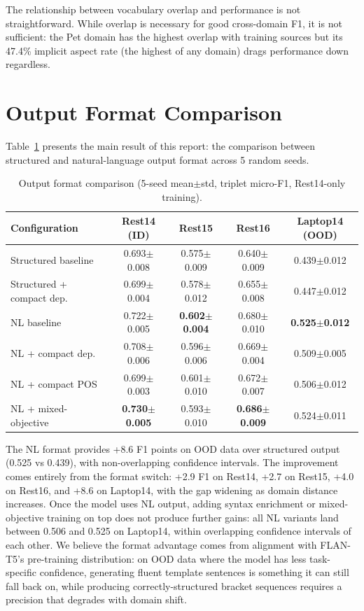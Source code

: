 \documentclass[12pt,a4paper]{report}
\begin{document}
The relationship between vocabulary overlap and performance is not straightforward. While overlap is necessary for good cross-domain F1, it is not sufficient: the Pet domain has the highest overlap with training sources but its 47.4\% implicit aspect rate (the highest of any domain) drags performance down regardless.


\section{Output Format Comparison}\label{sec:format-results}

Table~\ref{tab:format-5seed} presents the main result of this report: the comparison between structured and natural-language output format across 5 random seeds.

\begin{table}[H]
\centering
\caption{Output format comparison (5-seed mean$\pm$std, triplet micro-F1, Rest14-only training).}
\label{tab:format-5seed}
\small
\begin{tabular}{@{}lcccc@{}}
\toprule
\textbf{Configuration} & \textbf{Rest14 (ID)} & \textbf{Rest15} & \textbf{Rest16} & \textbf{Laptop14 (OOD)} \\
\midrule
Structured baseline & 0.693$\pm$0.008 & 0.575$\pm$0.009 & 0.640$\pm$0.009 & 0.439$\pm$0.012 \\
Structured + compact dep. & 0.699$\pm$0.004 & 0.578$\pm$0.012 & 0.655$\pm$0.008 & 0.447$\pm$0.012 \\
\midrule
NL baseline & 0.722$\pm$0.005 & \textbf{0.602$\pm$0.004} & 0.680$\pm$0.010 & \textbf{0.525$\pm$0.012} \\
NL + compact dep. & 0.708$\pm$0.006 & 0.596$\pm$0.006 & 0.669$\pm$0.004 & 0.509$\pm$0.005 \\
NL + compact POS & 0.699$\pm$0.003 & 0.601$\pm$0.010 & 0.672$\pm$0.007 & 0.506$\pm$0.012 \\
NL + mixed-objective & \textbf{0.730$\pm$0.005} & 0.593$\pm$0.010 & \textbf{0.686$\pm$0.009} & 0.524$\pm$0.011 \\
\bottomrule
\end{tabular}
\end{table}

The NL format provides +8.6 F1 points on OOD data over structured output (0.525 vs 0.439), with non-overlapping confidence intervals. The improvement comes entirely from the format switch: +2.9 F1 on Rest14, +2.7 on Rest15, +4.0 on Rest16, and +8.6 on Laptop14, with the gap widening as domain distance increases. Once the model uses NL output, adding syntax enrichment or mixed-objective training on top does not produce further gains: all NL variants land between 0.506 and 0.525 on Laptop14, within overlapping confidence intervals of each other. We believe the format advantage comes from alignment with FLAN-T5's pre-training distribution: on OOD data where the model has less task-specific confidence, generating fluent template sentences is something it can still fall back on, while producing correctly-structured bracket sequences requires a precision that degrades with domain shift.
\end{document}
